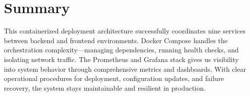 \section{Summary} \label{section:deployment_summary}

This containerized deployment architecture successfully coordinates nine services between backend and frontend environments. Docker Compose handles the orchestration complexity—managing dependencies, running health checks, and isolating network traffic. The Prometheus and Grafana stack gives us visibility into system behavior through comprehensive metrics and dashboards. With clear operational procedures for deployment, configuration updates, and failure recovery, the system stays maintainable and resilient in production.